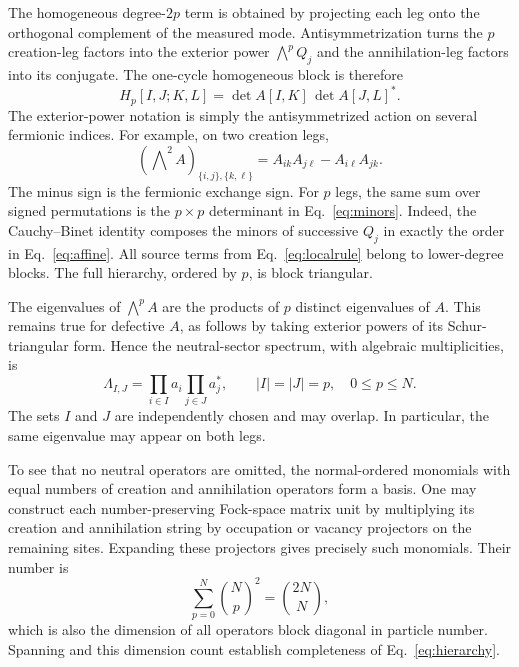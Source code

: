 \documentclass[aps,prb,onecolumn,nofootinbib,superscriptaddress,floatfix]{revtex4-2}
\begin{document}
The homogeneous degree-$2p$ term is obtained by projecting each leg
onto the orthogonal complement of the measured mode.
Antisymmetrization turns the $p$ creation-leg factors into the
exterior power $\bigwedge^p Q_j$ and the annihilation-leg factors
into its conjugate. The one-cycle homogeneous block is therefore
\begin{equation}
 H_p[I,J;K,L]=\det A[I,K]\,\det A[J,L]^*.
 \label{eq:minors}
\end{equation}
The exterior-power notation is simply the antisymmetrized action
on several fermionic indices. For example, on two creation legs,
\begin{equation}
 \left(\bigwedge\nolimits^2 A\right)_{\{i,j\},\{k,\ell\}}
       =A_{ik}A_{j\ell}-A_{i\ell}A_{jk}.
 \label{eq:wedge_example}
\end{equation}
The minus sign is the fermionic exchange sign. For $p$ legs,
the same sum over signed permutations is the $p\times p$
determinant in Eq.~\eqref{eq:minors}.
Indeed, the Cauchy--Binet identity composes the minors of successive
$Q_j$ in exactly the order in Eq.~\eqref{eq:affine}. All source
terms from Eq.~\eqref{eq:localrule} belong to lower-degree blocks.
The full hierarchy, ordered by $p$, is block triangular.

The eigenvalues of $\bigwedge^p A$ are the products of $p$ distinct
eigenvalues of $A$. This remains true for defective $A$, as follows
by taking exterior powers of its Schur-triangular form. Hence the
neutral-sector spectrum, with algebraic multiplicities, is
\begin{equation}
 \Lambda_{I,J}=\prod_{i\in I}a_i\prod_{j\in J}a_j^*,\qquad
 |I|=|J|=p,\quad 0\le p\le N. \label{eq:hierarchy}
\end{equation}
The sets $I$ and $J$ are independently chosen and may overlap.
In particular, the same eigenvalue may appear on both legs.

To see that no neutral operators are omitted, the normal-ordered
monomials with equal numbers of creation and annihilation operators
form a basis. One may construct each number-preserving Fock-space
matrix unit by multiplying its creation and annihilation string by
occupation or vacancy projectors on the remaining sites. Expanding
these projectors gives precisely such monomials. Their number is
\begin{equation}
 \sum_{p=0}^{N}\binom Np^2=\binom{2N}{N}, \label{eq:span}
\end{equation}
which is also the dimension of all operators block diagonal in
particle number. Spanning and this dimension count establish
completeness of Eq.~\eqref{eq:hierarchy}.
\end{document}
